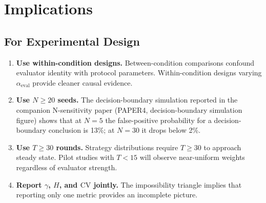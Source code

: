 \documentclass[11pt]{article}
\begin{document}
\section{Implications}

\subsection{For Experimental Design}

\begin{enumerate}[leftmargin=*,nosep]
 \item \textbf{Use within-condition designs.} Between-condition comparisons confound evaluator identity with protocol parameters. Within-condition designs varying $\alpha_{\text{eval}}$ provide cleaner causal evidence.
 \item \textbf{Use $N \geq 20$ seeds.} The decision-boundary simulation reported in the companion N-sensitivity paper (PAPER4, decision-boundary simulation figure) shows that at $N{=}5$ the false-positive probability for a decision-boundary conclusion is 13\%; at $N{=}30$ it drops below 2\%.
 \item \textbf{Use $T \geq 30$ rounds.} Strategy distributions require $T \geq 30$ to approach steady state. Pilot studies with $T < 15$ will observe near-uniform weights regardless of evaluator strength.
 \item \textbf{Report $\gamma$, $H$, and $\mathrm{CV}$ jointly.} The impossibility triangle implies that reporting only one metric provides an incomplete picture.
\end{enumerate}
\end{document}
